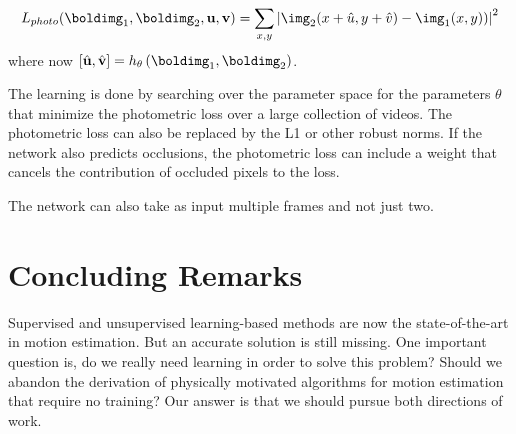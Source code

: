 \begin{equation}
L_{photo}(\boldimg_1,\boldimg_2,\mathbf{u}, \mathbf{v})= 
\sum_{x,y} \left| \img_2 (x+\hat{u},y+\hat{v}) - \img_1 (x,y)) \right| ^2 
\end{equation}
where now $\left[ \hat{\mathbf{u}}, \hat{\mathbf{v}} \right] =  h_\theta \left( \boldimg_1, \boldimg_2 \right)$.

The learning is done by searching over the parameter space for the parameters $\theta$ that minimize the photometric loss over a large collection of videos. The photometric loss can also be replaced by the L1 or other robust norms. If the network also predicts occlusions, the photometric loss can include a weight that cancels the contribution of occluded pixels to the loss. 

The network can also take as input multiple frames and not just two. 



\section{Concluding Remarks}

Supervised and unsupervised learning-based methods are now the state-of-the-art in motion estimation. But an accurate solution is still missing. One important question is, do we really need learning in order to solve this problem? Should we abandon the derivation of physically motivated algorithms for motion estimation that require no training? Our answer is that we should pursue both directions of work.
